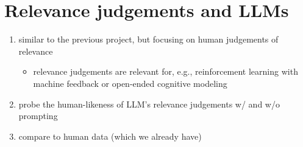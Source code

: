 \documentclass[fleqn,reqno,10pt]{article}
\begin{document}
\section{Relevance judgements and LLMs}

\begin{enumerate}
  \item similar to the previous project, but focusing on human judgements of relevance
  \begin{itemize}
    \item relevance judgements are relevant for, e.g., reinforcement learning with machine feedback or open-ended cognitive modeling
  \end{itemize}
  \item probe the human-likeness of LLM's relevance judgements w/ and w/o prompting
  \item compare to human data (which we already have)
\end{enumerate}




\end{document}
